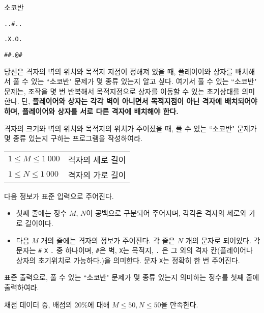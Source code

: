 \begin{problem}{소코반}
	\begin{center}
	\texttt{..\#..}
	
	\texttt{.X.O.}
	
	\texttt{\#\#.@\#}
	\end{center}

	
	당신은 격자의 벽의 위치와 목적지 지점이 정해져 있을 때, 플레이어와 상자를 배치해서 풀 수 있는 ``소코반" 문제가 몇 종류 있는지 알고 싶다. 여기서 풀 수 있는 ``소코반" 문제는, 조작을 몇 번 반복해서 목적지점으로 상자를 이동할 수 있는 초기상태를 의미한다. 단, \textbf{플레이어와 상자는 각각 벽이 아니면서 목적지점이 아닌 격자에 배치되어야 하며, 플레이어와 상자를 서로 다른 격자에 배치해야 한다.}
	
	격자의 크기와 벽의 위치와 목적지의 위치가 주어졌을 때, 풀 수 있는 ``소코반" 문제가 몇 종류 있는지 구하는 프로그램을 작성하여라.
	
	\Constraints
	
	
	\begin{tabular}{ll}
		$1 \le M \le 1\ 000$ & 격자의 세로 길이 \\
		$1 \le N \le 1\ 000$ & 격자의 가로 길이 \\
		
	\end{tabular}
	
	
	\InputFile
	
	다음 정보가 표준 입력으로 주어진다.
	
	\begin{itemize}
		\item 첫째 줄에는 정수 $M$, $N$이 공백으로 구분되어 주어지며, 각각은 격자의 세로와 가로 길이이다.
		\item 다음 $M$ 개의 줄에는 격자의 정보가 주어진다. 각 줄은 $N$ 개의 문자로 되어있다. 각 문자는 \texttt{\#} \texttt{X} \texttt{.} 중 하나이며, \texttt{\#}은 벽, \texttt{X}는 목적지, \texttt{.} 은 그 외의 격자 칸(플레이어나 상자의 초기위치로 가능하다.)을 의미한다. 문자 \texttt{X}는 정확히 한 번 주어진다.
		
	\end{itemize}
	
	
	
	\OutputFile
	
	표준 출력으로, 풀 수 있는 ``소코반" 문제가 몇 종류 있는지 의미하는 정수를 첫째 줄에 출력하여라.
	
	\Scoring
	
	채점 데이터 중, 배점의 20\%에 대해 $M \le 50, N \le 50$을 만족한다.
	
	\Examples
	
	\begin{example}
	\end{example}
	

\end{problem}
